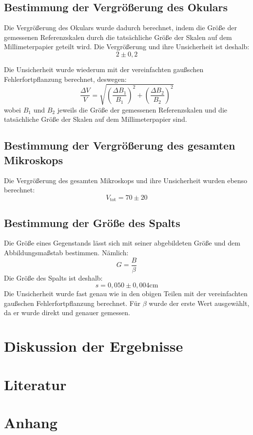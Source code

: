 \documentclass[11pt,a4paper]{article}
\begin{document}
\subsection{Bestimmung der Vergrößerung des Okulars}
Die Vergrößerung des Okulars wurde dadurch berechnet, indem die Größe der gemessenen Referenzskalen durch die tatsächliche Größe der Skalen auf dem Millimeterpapier geteilt wird. Die Vergrößerung und ihre Unsicherheit ist deshalb:
$$ 2 \pm 0,2 $$ 

Die Unsicherheit wurde wiederum mit der vereinfachten gaußschen Fehlerfortpflanzung berechnet, deswegen:
$$\frac{\Delta V}{V} = \sqrt{\left(\frac{\Delta B_1}{B_1}\right)^2+\left(\frac{\Delta B_2}{B_2}\right)^2}$$
wobei $B_1$ und $B_2$ jeweils die Größe der gemessenen Referenzskalen und die tatsächliche Größe der Skalen auf dem Millimeterpapier sind. 

\subsection{Bestimmung der Vergrößerung des gesamten Mikroskops}
Die Vergrößerung des gesamten Mikroskops und ihre Unsicherheit wurden ebenso berechnet:
$$V_\textrm{tot} = 70 \pm 20$$

\subsection{Bestimmung der Größe des Spalts}
Die Größe eines Gegenstands lässt sich mit seiner abgebildeten Größe und dem Abbildungsmaßstab bestimmen. Nämlich:
$$ G = \frac{B}{\beta}$$
Die Größe des Spalts ist deshalb:
$$ s = 0,050 \pm 0,004 \textrm{cm}$$
Die Unsicherheit wurde fast genau wie in den obigen Teilen mit der vereinfachten gaußschen Fehlerfortpflanzung berechnet. Für $\beta$ wurde der erste Wert ausgewählt, da er wurde direkt und genauer gemessen. 
\section{Diskussion der Ergebnisse}

\section{Literatur}

\section{Anhang}
\end{document}

